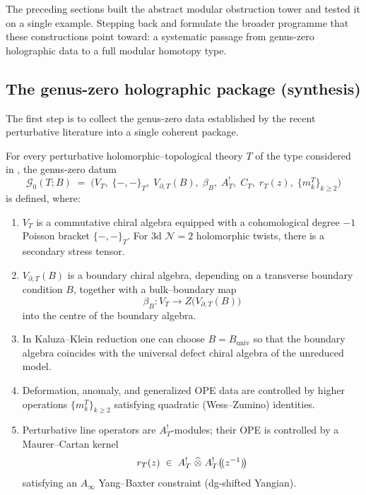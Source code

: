 The preceding sections built the abstract modular obstruction tower and tested it on a single
example. Stepping back and formulate the broader programme that these constructions
point toward: a systematic passage from genus-zero holographic data to a full modular
homotopy type.

\subsection{The genus-zero holographic package (synthesis)}

The first step is to collect the genus-zero data established by the recent perturbative
literature into a single coherent package.

\begin{theorem}
For every perturbative holomorphic--topological theory $T$ of the type considered in
\cite{CDG20, Zeng23, GKW25, KZ25, DNP25}, the genus-zero datum
\[
\mathcal G_0(T;B)
\;=\;
\bigl(V_T,\;\{-,-\}_T,\;V_{\partial,T}(B),\;\beta_B,\;A_T^!,\;C_T,\;r_T(z),\;\{m_k^T\}_{k\ge 2}\bigr)
\]
is defined, where:
\begin{enumerate}[label=\textup{(\arabic*)}]
\item $V_T$ is a commutative chiral algebra equipped with a cohomological degree $-1$ Poisson
bracket $\{-,-\}_T$. For $3$d $\mathcal N=2$ holomorphic twists, there is a secondary stress
tensor.

\item $V_{\partial,T}(B)$ is a boundary chiral algebra, depending on a transverse boundary
condition $B$, together with a bulk--boundary map
\[
\beta_B:V_T\longrightarrow Z\bigl(V_{\partial,T}(B)\bigr)
\]
into the centre of the boundary algebra.

\item In Kaluza--Klein reduction one can choose $B=B_{\mathrm{univ}}$ so that the boundary algebra
coincides with the universal defect chiral algebra of the unreduced model.

\item Deformation, anomaly, and generalized OPE data are controlled by higher operations
$\{m_k^T\}_{k\ge 2}$ satisfying quadratic (Wess--Zumino) identities.

\item Perturbative line operators are $A_T^!$-modules; their OPE is controlled by a
Maurer--Cartan kernel
\[
r_T(z)\;\in\;A_T^!\;\widehat\otimes\;A_T^!\bigl(\!(z^{-1})\!\bigr)
\]
satisfying an $A_\infty$ Yang--Baxter constraint (dg-shifted Yangian).
\end{enumerate}
\end{theorem}


